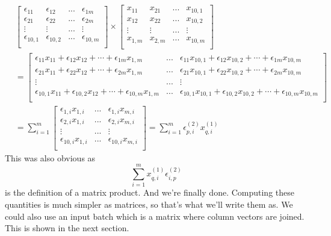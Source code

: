 \documentclass{article}
\begin{document}
    \begin{align*}&
        \begin{bmatrix}
            \epsilon_{11} & \epsilon_{12}&...&\epsilon_{1m}\\
            \epsilon_{21} & \epsilon_{22}&...&\epsilon_{2m}\\
            \vdots & \vdots&...&\vdots\\
            \epsilon_{10,1} & \epsilon_{10,2}&...&\epsilon_{10,m}\\
        \end{bmatrix}\times 
        \begin{bmatrix}
            x_{11} & x_{21}&...&x_{10,1}\\
            x_{12} & x_{22}&...&x_{10,2}\\
            \vdots & \vdots&...&\vdots\\
            x_{1,m} & x_{2,m}&...&x_{10,m}\\ 
        \end{bmatrix} \\&= 
        \begin{bmatrix}
            \epsilon_{11}x_{11}+\epsilon_{12}x_{12}+\cdots+\epsilon_{1m}x_{1,m} & ...&\epsilon_{11}x_{10,1}+\epsilon_{12}x_{10,2}+\cdots+\epsilon_{1m}x_{10,m}\\
            \epsilon_{21}x_{11}+\epsilon_{22}x_{12}+\cdots+\epsilon_{2m}x_{1,m} & ...& \epsilon_{21}x_{10,1}+\epsilon_{22}x_{10,2}+\cdots+\epsilon_{2m}x_{10,m}\\
             \vdots&...&\vdots\\
            \epsilon_{10,1}x_{11}+\epsilon_{10,2}x_{12}+\cdots+\epsilon_{10,m}x_{1,m} &...&\epsilon_{10,1}x_{10,1}+\epsilon_{10,2}x_{10,2}+\cdots+\epsilon_{10,m}x_{10,m}\\ 
        \end{bmatrix}\\
        &= \sum_{i=1}^m\begin{bmatrix}
            \epsilon_{1,i}x_{1,i} & ...&\epsilon_{1,i}x_{m,i}\\
            \epsilon_{2,i}x_{1,i} & ...& \epsilon_{2,i}x_{m,i}\\
             \vdots&...&\vdots\\
            \epsilon_{10,i}x_{1,i} &...&\epsilon_{10,i}x_{m,i}\\ 
        \end{bmatrix} = \sum_{i=1}^m\epsilon^{(2)}_{p,i} x^{(1)}_{q,i}
    \end{align*}
This was also obvious as \[\sum_{i=1}^m x^{(1)}_{q,i}\epsilon^{(2)}_{i,p}\] is the definition of a matrix product.
And we're finally done. Computing these quantities is much simpler as matrices, so that's what we'll write them as. We could also use an input batch which is a matrix where column vectors are joined. This is shown in the next section. 
\end{document}
